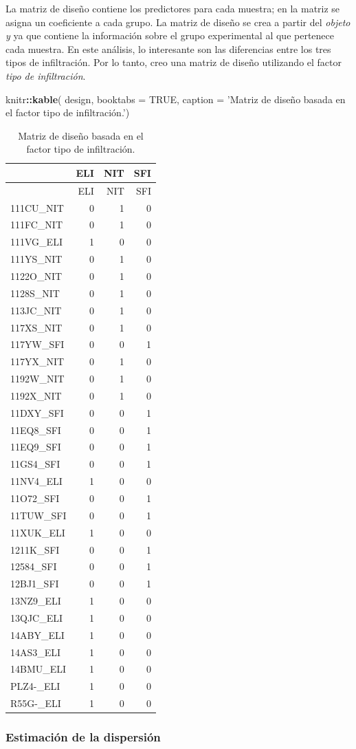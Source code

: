 \documentclass[]{article}
\newenvironment{Shaded}{\begin{snugshade}}{\end{snugshade}}
\newcommand{\DataTypeTok}[1]{\textcolor[rgb]{0.13,0.29,0.53}{#1}}
\newcommand{\KeywordTok}[1]{\textcolor[rgb]{0.13,0.29,0.53}{\textbf{#1}}}
\newcommand{\NormalTok}[1]{#1}
\newcommand{\OperatorTok}[1]{\textcolor[rgb]{0.81,0.36,0.00}{\textbf{#1}}}
\newcommand{\OtherTok}[1]{\textcolor[rgb]{0.56,0.35,0.01}{#1}}
\newcommand{\StringTok}[1]{\textcolor[rgb]{0.31,0.60,0.02}{#1}}
\begin{document}
La matriz de diseño contiene los predictores para cada muestra; en la
matriz se asigna un coeficiente a cada grupo. La matriz de diseño se
crea a partir del \emph{objeto y} ya que contiene la información sobre
el grupo experimental al que pertenece cada muestra. En este análisis,
lo interesante son las diferencias entre los tres tipos de infiltración.
Por lo tanto, creo una matriz de diseño utilizando el factor \emph{tipo
de infiltración}.

\begin{Shaded}
\begin{Highlighting}[]
\NormalTok{knitr}\OperatorTok{::}\KeywordTok{kable}\NormalTok{(}
\NormalTok{  design, }\DataTypeTok{booktabs =} \OtherTok{TRUE}\NormalTok{,}
  \DataTypeTok{caption =} \StringTok{'Matriz de diseño basada en el factor tipo de infiltración.'}\NormalTok{)}
\end{Highlighting}
\end{Shaded}

\begin{longtable}[]{@{}lrrr@{}}
\caption{Matriz de diseño basada en el factor tipo de
infiltración.}\tabularnewline
\toprule
& ELI & NIT & SFI\tabularnewline
\midrule
\endfirsthead
\toprule
& ELI & NIT & SFI\tabularnewline
\midrule
\endhead
111CU\_NIT & 0 & 1 & 0\tabularnewline
111FC\_NIT & 0 & 1 & 0\tabularnewline
111VG\_ELI & 1 & 0 & 0\tabularnewline
111YS\_NIT & 0 & 1 & 0\tabularnewline
1122O\_NIT & 0 & 1 & 0\tabularnewline
1128S\_NIT & 0 & 1 & 0\tabularnewline
113JC\_NIT & 0 & 1 & 0\tabularnewline
117XS\_NIT & 0 & 1 & 0\tabularnewline
117YW\_SFI & 0 & 0 & 1\tabularnewline
117YX\_NIT & 0 & 1 & 0\tabularnewline
1192W\_NIT & 0 & 1 & 0\tabularnewline
1192X\_NIT & 0 & 1 & 0\tabularnewline
11DXY\_SFI & 0 & 0 & 1\tabularnewline
11EQ8\_SFI & 0 & 0 & 1\tabularnewline
11EQ9\_SFI & 0 & 0 & 1\tabularnewline
11GS4\_SFI & 0 & 0 & 1\tabularnewline
11NV4\_ELI & 1 & 0 & 0\tabularnewline
11O72\_SFI & 0 & 0 & 1\tabularnewline
11TUW\_SFI & 0 & 0 & 1\tabularnewline
11XUK\_ELI & 1 & 0 & 0\tabularnewline
1211K\_SFI & 0 & 0 & 1\tabularnewline
12584\_SFI & 0 & 0 & 1\tabularnewline
12BJ1\_SFI & 0 & 0 & 1\tabularnewline
13NZ9\_ELI & 1 & 0 & 0\tabularnewline
13QJC\_ELI & 1 & 0 & 0\tabularnewline
14ABY\_ELI & 1 & 0 & 0\tabularnewline
14AS3\_ELI & 1 & 0 & 0\tabularnewline
14BMU\_ELI & 1 & 0 & 0\tabularnewline
PLZ4-\_ELI & 1 & 0 & 0\tabularnewline
R55G-\_ELI & 1 & 0 & 0\tabularnewline
\bottomrule
\end{longtable}

\hypertarget{estimaciuxf3n-de-la-dispersiuxf3n}{%
\subsubsection{Estimación de la
dispersión}\label{estimaciuxf3n-de-la-dispersiuxf3n}}
\end{document}
